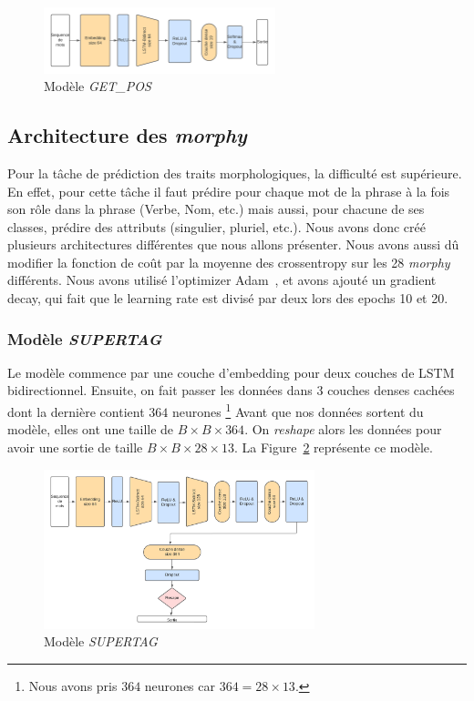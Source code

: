\documentclass[a4paper]{article}
\begin{document}
\begin{figure}[H]
    \centering
    \includegraphics[width=0.6\textwidth]{get_pos.png}
    \caption{Modèle \textit{GET\_POS}}
    \label{fig: model getpos}
\end{figure} 

\subsection{Architecture des \textit{morphy}}

Pour la tâche de prédiction des traits morphologiques, la difficulté est supérieure. En effet, pour cette tâche 
il faut prédire pour chaque mot de la phrase à la fois son rôle dans la phrase (Verbe, Nom, etc.) mais aussi, 
pour chacune de ses classes, prédire des attributs (singulier, pluriel, etc.). Nous avons donc créé plusieurs 
architectures différentes que nous allons présenter. Nous avons aussi dû modifier la fonction de coût par 
la moyenne des crossentropy sur les 28 \textit{morphy} différents. Nous avons utilisé l'optimizer Adam~\cite{kingma2014adam},
et avons ajouté un gradient decay, qui fait que le learning rate est divisé par deux lors des epochs 10 et 20.

\subsubsection{Modèle \textit{SUPERTAG}}

Le modèle commence par une couche d'embedding pour deux couches de LSTM bidirectionnel. Ensuite, on fait passer les données 
dans 3 couches denses cachées dont la dernière contient $364$ neurones
\footnote{Nous avons pris $364$ neurones car $364 = 28 \times 13$.}
Avant que nos données sortent du modèle, elles ont une
taille de $B \times B \times 364$. On \textit{reshape} alors les données pour avoir une sortie de taille 
$B \times B \times 28 \times 13$. La Figure~\ref{fig: model supertag} représente ce modèle.

\begin{figure}[H]
    \centering
    \includegraphics[width=0.7\textwidth]{get_morphy_supertag.png}
    \caption{Modèle \textit{SUPERTAG}}
    \label{fig: model supertag}
\end{figure}
\end{document}
